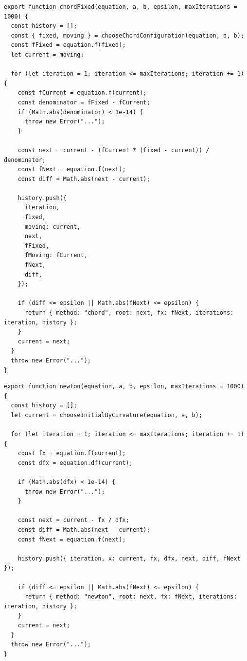 \documentclass[12pt,a4paper]{article}
\begin{document}
\begin{lstlisting}[caption={Метод хорд с неподвижным концом (фрагмент \texttt{src/methods/equations.js})}]
export function chordFixed(equation, a, b, epsilon, maxIterations = 1000) {
  const history = [];
  const { fixed, moving } = chooseChordConfiguration(equation, a, b);
  const fFixed = equation.f(fixed);
  let current = moving;

  for (let iteration = 1; iteration <= maxIterations; iteration += 1) {
    const fCurrent = equation.f(current);
    const denominator = fFixed - fCurrent;
    if (Math.abs(denominator) < 1e-14) {
      throw new Error("...");
    }

    const next = current - (fCurrent * (fixed - current)) / denominator;
    const fNext = equation.f(next);
    const diff = Math.abs(next - current);

    history.push({
      iteration,
      fixed,
      moving: current,
      next,
      fFixed,
      fMoving: fCurrent,
      fNext,
      diff,
    });

    if (diff <= epsilon || Math.abs(fNext) <= epsilon) {
      return { method: "chord", root: next, fx: fNext, iterations: iteration, history };
    }
    current = next;
  }
  throw new Error("...");
}
\end{lstlisting}

\begin{lstlisting}[caption={Метод Ньютона (фрагмент \texttt{src/methods/equations.js})}]
export function newton(equation, a, b, epsilon, maxIterations = 1000) {
  const history = [];
  let current = chooseInitialByCurvature(equation, a, b);

  for (let iteration = 1; iteration <= maxIterations; iteration += 1) {
    const fx = equation.f(current);
    const dfx = equation.df(current);

    if (Math.abs(dfx) < 1e-14) {
      throw new Error("...");
    }

    const next = current - fx / dfx;
    const diff = Math.abs(next - current);
    const fNext = equation.f(next);

    history.push({ iteration, x: current, fx, dfx, next, diff, fNext });

    if (diff <= epsilon || Math.abs(fNext) <= epsilon) {
      return { method: "newton", root: next, fx: fNext, iterations: iteration, history };
    }
    current = next;
  }
  throw new Error("...");
}
\end{lstlisting}
\end{document}
